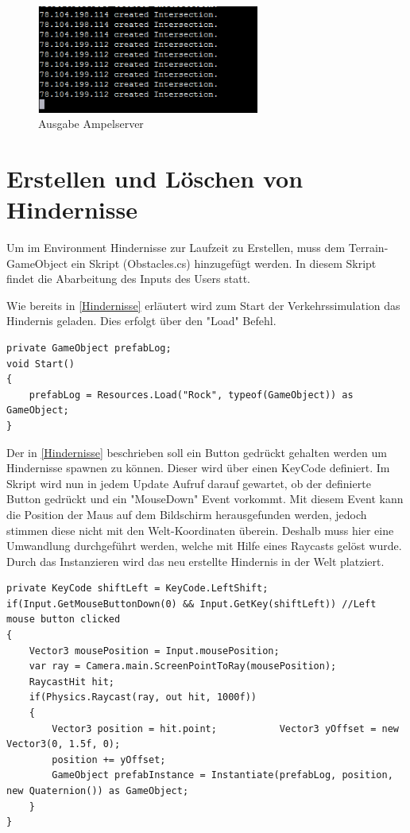 \begin{figure}[H]
\begin{center}
	\includegraphics[width=0.65\textwidth]{BilderAllgemein/ampelserver.png}
\end{center}
	\caption{Ausgabe Ampelserver}
	\label{img:ampel}
\end{figure}

\section{Erstellen und Löschen von Hindernisse}

Um im Environment Hindernisse zur Laufzeit zu Erstellen, muss dem Terrain-GameObject ein Skript (Obstacles.cs) hinzugefügt werden. In diesem Skript findet die Abarbeitung des Inputs des Users statt.

Wie bereits in \ref{Hindernisse} erläutert wird zum Start der Verkehrssimulation das Hindernis geladen. Dies erfolgt über den "Load" Befehl.

\begin{lstlisting}[caption={Laden des Hindernisses},label={lst:Hinderniss_laden}]
private GameObject prefabLog;
void Start()
{
	prefabLog = Resources.Load("Rock", typeof(GameObject)) as GameObject;
}
\end{lstlisting}

Der in \ref{Hindernisse} beschrieben soll ein Button gedrückt gehalten werden um Hindernisse spawnen zu können. Dieser wird über einen KeyCode definiert. Im Skript wird nun in jedem Update Aufruf darauf gewartet, ob der definierte Button gedrückt und ein "MouseDown" Event vorkommt. Mit diesem Event kann die Position der Maus auf dem Bildschirm herausgefunden werden, jedoch stimmen diese nicht mit den Welt-Koordinaten überein. Deshalb muss hier eine Umwandlung durchgeführt werden, welche mit Hilfe eines Raycasts gelöst wurde. Durch das Instanzieren wird das neu erstellte Hindernis in der Welt platziert.

\begin{lstlisting}[caption={Erstellen des Hindernisses},label={lst:Hinderniss_erstellen}]
private KeyCode shiftLeft = KeyCode.LeftShift;
if(Input.GetMouseButtonDown(0) && Input.GetKey(shiftLeft)) //Left mouse button clicked
{
	Vector3 mousePosition = Input.mousePosition;
	var ray = Camera.main.ScreenPointToRay(mousePosition);
	RaycastHit hit;
	if(Physics.Raycast(ray, out hit, 1000f))
	{
		Vector3 position = hit.point;			Vector3 yOffset = new Vector3(0, 1.5f, 0);
		position += yOffset;			
		GameObject prefabInstance = Instantiate(prefabLog, position, new Quaternion()) as GameObject;
	}
}
\end{lstlisting}

